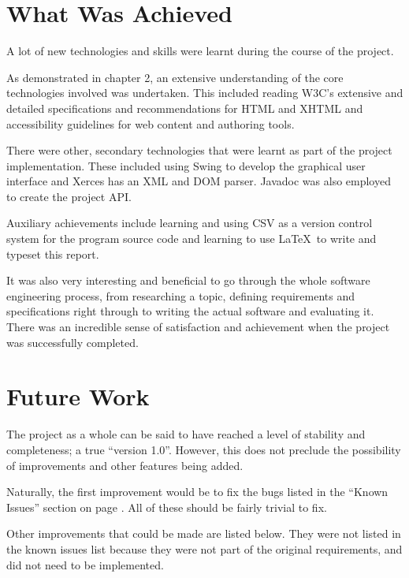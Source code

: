 
\section{What Was Achieved}

A lot of new technologies and skills were learnt during the course of the
project. 

As demonstrated in chapter 2, an extensive understanding of the core
technologies involved was undertaken. This included reading W3C's extensive and
detailed specifications and recommendations for HTML and XHTML and
accessibility guidelines for web content and authoring tools.

There were other, secondary technologies that were learnt as part of the
project implementation. These included using Swing to develop the 
graphical user interface and Xerces has an XML and DOM parser. Javadoc
was also employed to create the project API.

Auxiliary achievements include learning and using CSV as a version control
system for the program source code and learning to use \LaTeX\ to write and
typeset this report.

It was also very interesting and beneficial to go through the whole software
engineering process, from researching a topic, defining requirements and
specifications right through to writing the actual software and evaluating it.
There was an incredible sense of satisfaction and achievement when the project
was successfully completed. 

\section{Future Work}

\label{futurework}

The project as a whole can be said to have reached a level
of stability and completeness; a true ``version 1.0''. However,
this does not preclude the possibility of improvements and
other features being added.

Naturally, the first improvement would be to fix the bugs listed
in the ``Known Issues'' section on page \pageref{knownissues}. All
of these should be fairly trivial to fix.

Other improvements that could be made are listed below. They
were not listed in the known issues list because they were not
part of the original requirements, and did not need to be 
implemented.

